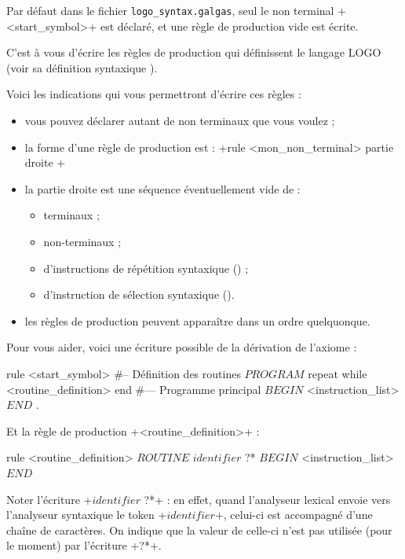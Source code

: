 Par défaut dans le fichier \texttt{logo\_syntax.galgas}, seul le non terminal \ggs+<start_symbol>+ est déclaré, et une règle de production vide est écrite.

C'est à vous d'écrire les règles de production qui définissent le langage LOGO (voir sa définition syntaxique ).

Voici les indications qui vous permettront d'écrire ces règles :
\begin{itemize}
  \item vous pouvez déclarer autant de non terminaux que vous voulez ;
  \item la forme d'une règle de production est : \ggs+rule <mon_non_terminal> { partie droite }+
  \item la partie droite est une séquence éventuellement vide de :
  \begin{itemize}
    \item terminaux ;
    \item non-terminaux ;
    \item d'instructions de répétition syntaxique () ;
    \item d'instruction de sélection syntaxique ().
  \end{itemize}
  \item les règles de production peuvent apparaître dans un ordre quelquonque.
\end{itemize}

Pour vous aider, voici une écriture possible de la dérivation de l'axiome :

\begin{galgas}
rule <start_symbol> {
#-- Définition des routines
  $PROGRAM$
  repeat
  while
    <routine_definition>
  end
#--- Programme principal
  $BEGIN$
  <instruction_list> 
  $END$
  $.$
}
\end{galgas}

Et la règle de production \ggs+<routine_definition>+ :

\begin{galgas}
rule <routine_definition> {
  $ROUTINE$
  $identifier$ ?*
  $BEGIN$
  <instruction_list>
  $END$
}
\end{galgas}

Noter l’écriture \ggs+$identifier$ ?*+ : en effet, quand l’analyseur lexical envoie vers l’analyseur syntaxique le token \ggs+$identifier$+, celui-ci est accompagné d’une chaîne de caractères. On indique que la valeur de celle-ci n’est pas utilisée (pour le moment) par l’écriture \ggs+?*+.

